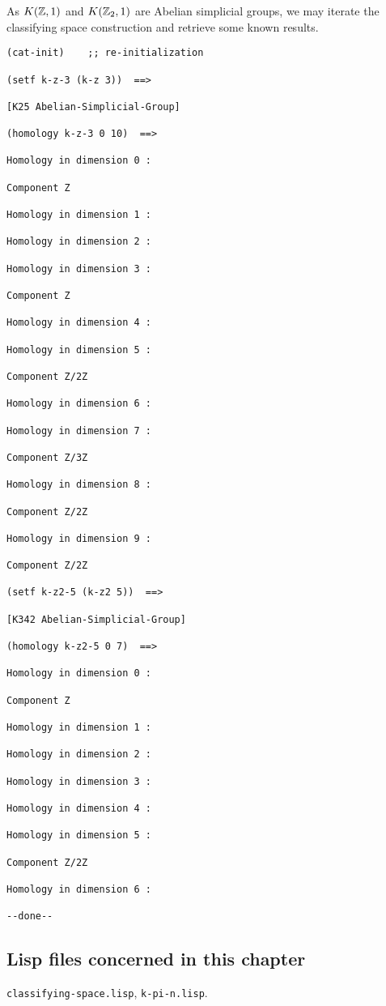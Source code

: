 As $K({\mathbb{Z}}, 1)$ and $K({{\mathbb{Z}}_2}, 1)$ are Abelian simplicial groups, we may iterate the classifying
space construction and retrieve some known results.
{\footnotesize\begin{verbatim}
(cat-init)    ;; re-initialization

(setf k-z-3 (k-z 3))  ==>

[K25 Abelian-Simplicial-Group]

(homology k-z-3 0 10)  ==>

Homology in dimension 0 :

Component Z

Homology in dimension 1 :

Homology in dimension 2 :

Homology in dimension 3 :

Component Z

Homology in dimension 4 :

Homology in dimension 5 :

Component Z/2Z

Homology in dimension 6 :

Homology in dimension 7 :

Component Z/3Z

Homology in dimension 8 :

Component Z/2Z

Homology in dimension 9 :

Component Z/2Z

(setf k-z2-5 (k-z2 5))  ==>

[K342 Abelian-Simplicial-Group]

(homology k-z2-5 0 7)  ==>

Homology in dimension 0 :

Component Z

Homology in dimension 1 :

Homology in dimension 2 :

Homology in dimension 3 :

Homology in dimension 4 :

Homology in dimension 5 :

Component Z/2Z

Homology in dimension 6 :

--done--
\end{verbatim}}

\subsection* {Lisp files concerned in this chapter}

{\tt classifying-space.lisp}, {\tt k-pi-n.lisp}.

